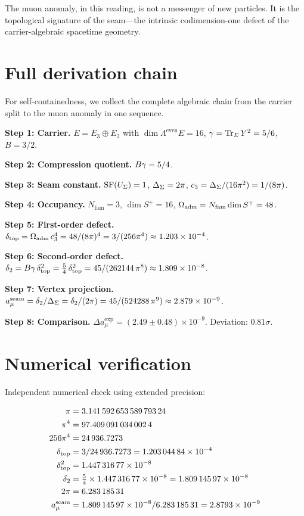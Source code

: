 The muon anomaly, in this reading, is not a messenger of new particles. It
is the topological signature of the seam---the intrinsic codimension-one
defect of the carrier-algebraic spacetime geometry.

\appendix

\section{Full derivation chain}\label{app:chain}

For self-containedness, we collect the complete algebraic chain from the
carrier split to the muon anomaly in one sequence.

\medskip

\textbf{Step 1: Carrier.}
$E=E_3\oplus E_2$ with $\dim\Lambda^{\mathrm{even}}E=16$,\quad
$\gamma=\operatorname{Tr}_EY^2=5/6$,\quad $B=3/2$.

\textbf{Step 2: Compression quotient.}
$B\gamma=5/4$.

\textbf{Step 3: Seam constant.}
$\operatorname{SF}(U_\Sigma)=1$, $\Delta_\Sigma=2\pi$,
$c_3=\Delta_\Sigma/(16\pi^2)=1/(8\pi)$.

\textbf{Step 4: Occupancy.}
$N_{\mathrm{fam}}=3$, $\dim S^+=16$,
$\Omega_{\mathrm{adm}}=N_{\mathrm{fam}}\dim S^+=48$.

\textbf{Step 5: First-order defect.}
$\delta_{\mathrm{top}}=\Omega_{\mathrm{adm}}\,c_3^4=48/(8\pi)^4=3/(256\pi^4)\approx\num{1.203e-4}$.

\textbf{Step 6: Second-order defect.}
$\delta_2=B\gamma\,\delta_{\mathrm{top}}^2=\frac54\,\delta_{\mathrm{top}}^2
=45/(262144\,\pi^8)\approx\num{1.809e-8}$.

\textbf{Step 7: Vertex projection.}
$a_\mu^{\mathrm{seam}}=\delta_2/\Delta_\Sigma=\delta_2/(2\pi)
=45/(524288\,\pi^9)\approx\num{2.879e-9}$.

\textbf{Step 8: Comparison.}
$\Delta a_\mu^{\exp}=(2.49\pm0.48)\times10^{-9}$.
Deviation: $0.81\sigma$.


\section{Numerical verification}\label{app:numerics}

Independent numerical check using extended precision:

\begin{align}
\pi &= \num{3.14159265358979324}\notag\\
\pi^4 &= \num{97.4090910340024}\notag\\
256\pi^4 &= \num{24936.7273}\notag\\
\delta_{\mathrm{top}} &= 3/\num{24936.7273} = \num{1.20304484e-4}\notag\\
\delta_{\mathrm{top}}^2 &= \num{1.44731677e-8}\notag\\
\delta_2 &= \tfrac54\times\num{1.44731677e-8} = \num{1.80914597e-8}\notag\\
2\pi &= \num{6.28318531}\notag\\
a_\mu^{\mathrm{seam}} &= \num{1.80914597e-8}/\num{6.28318531}
= \num{2.8793e-9}\label{eq:check}
\end{align}


